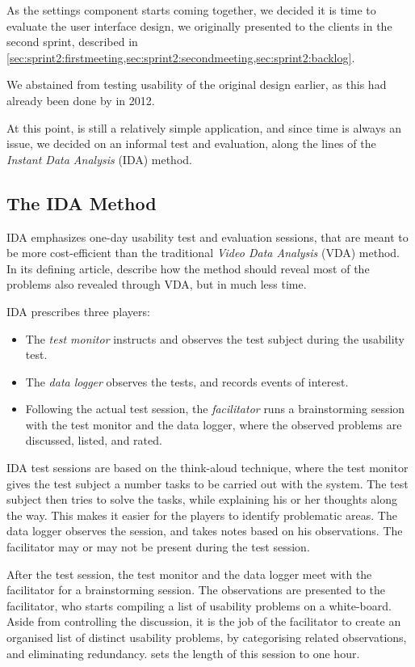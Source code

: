 As the settings component starts coming together, we decided it is time to evaluate the user interface design, we originally presented to the clients in the second sprint, described in \cref{sec:sprint2:firstmeeting,sec:sprint2:secondmeeting,sec:sprint2:backlog}.

We abstained from testing usability of the original \launcher design earlier, as this had already been done by \citet{launcher2012} in 2012.

At this point, \launcher is still a relatively simple application, and since time is always an issue, we decided on an informal test and evaluation, along the lines of the \textit{Instant Data Analysis} (IDA) method. 

\subsection{The IDA Method}
IDA emphasizes one-day usability test and evaluation sessions, that are meant to be more cost-efficient than the traditional \textit{Video Data Analysis} (VDA) method. 
In its defining article, \citet{idaArticle} describe how the method should reveal most of the problems also revealed through VDA, but in much less time. 

IDA prescribes three players: 
\begin{itemize}
	\item The \textit{test monitor} instructs and observes the test subject during the usability test.
	\item The \textit{data logger} observes the tests, and records events of interest.
	\item Following the actual test session, the \textit{facilitator} runs a brainstorming session with the test monitor and the data logger, where the observed problems are discussed, listed, and rated. 
\end{itemize}

IDA test sessions are based on the think-aloud technique, where the test monitor gives the test subject a number tasks to be carried out with the system. 
The test subject then tries to solve the tasks, while explaining his or her thoughts along the way. 
This makes it easier for the players to identify problematic areas. 
The data logger observes the session, and takes notes based on his observations. 
The facilitator may or may not be present during the test session.

After the test session, the test monitor and the data logger meet with the facilitator for a brainstorming session. 
The observations are presented to the facilitator, who starts compiling a list of usability problems on a white-board. 
Aside from controlling the discussion, it is the job of the facilitator to create an organised list of distinct usability problems, by categorising related observations, and eliminating redundancy. \citet{idaArticle} sets the length of this session to one hour. 

